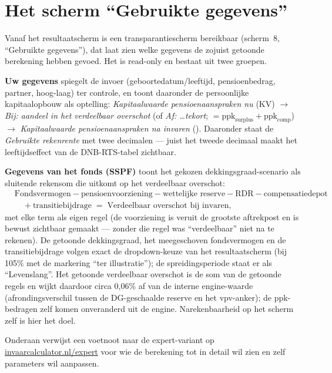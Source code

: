 \documentclass[11pt,a4paper]{article}
\newcommand{\ppk}{\text{ppk}}
\newcommand{\ppktot}{\text{ppkTotal}}
\begin{document}
\section{Het scherm ``Gebruikte gegevens''}
\label{sec:parameters-scherm}

Vanaf het resultaatscherm is een transparantiescherm bereikbaar (scherm~8, ``Gebruikte gegevens''), dat laat zien welke gegevens de zojuist getoonde berekening hebben gevoed. Het is read-only en bestaat uit twee groepen.

\textbf{Uw gegevens} spiegelt de invoer (geboortedatum/leeftijd, pensioenbedrag, partner, hoog-laag) ter controle, en toont daaronder de persoonlijke kapitaalopbouw als optelling: \emph{Kapitaalwaarde pensioenaanspraken nu} (KV) $\to$ \emph{Bij: aandeel in het verdeelbaar overschot} (of \emph{Af: \ldots tekort}; $= \ppk_{\text{surplus}} + \ppk_{\text{comp}}$) $\to$ \emph{Kapitaalwaarde pensioenaanspraken na invaren} (\ppktot). Daaronder staat de \emph{Gebruikte rekenrente} met twee decimalen --- juist het tweede decimaal maakt het leeftijdseffect van de DNB-RTS-tabel zichtbaar.

\textbf{Gegevens van het fonds (SSPF)} toont het gekozen dekkingsgraad-scenario als sluitende rekensom die uitkomt op het verdeelbaar overschot:
\begin{align*}
&\text{Fondsvermogen} - \text{pensioenvoorziening} - \text{wettelijke reserve} - \text{RDR} - \text{compensatiedepot}\\
&\quad + \text{transitiebijdrage} \;=\; \text{Verdeelbaar overschot bij invaren},
\end{align*}
met elke term als eigen regel (de voorziening is veruit de grootste aftrekpost en is bewust zichtbaar gemaakt --- zonder die regel was ``verdeelbaar'' niet na te rekenen). De getoonde dekkingsgraad, het meegeschoven fondsvermogen en de transitiebijdrage volgen exact de dropdown-keuze van het resultaatscherm (bij 105\% met de markering ``ter illustratie''); de spreidingsperiode staat er als ``Levenslang''. Het getoonde verdeelbaar overschot is de som van de getoonde regels en wijkt daardoor circa 0,06\% af van de interne engine-waarde (afrondingsverschil tussen de DG-geschaalde reserve en het vpv-anker); de ppk-bedragen zelf komen onveranderd uit de engine. Narekenbaarheid op het scherm zelf is hier het doel.

Onderaan verwijst een voetnoot naar de expert-variant op \href{https://invaarcalculator.nl/expert}{invaarcalculator.nl/expert} voor wie de berekening tot in detail wil zien en zelf parameters wil aanpassen.
\end{document}
